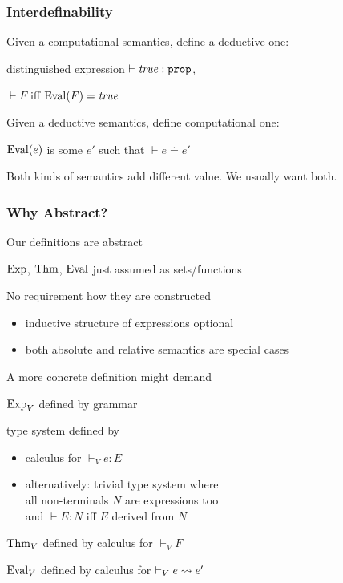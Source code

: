 \begin{frame}\frametitle{Interdefinability}
\begin{blockitems}{Given a computational semantics, define a deductive one:}
\item distinguished expression $\vdash \mathit{true}:\mathtt{prop}$,
\item $\vdash F$ iff $\mathrm{Eval}(F)=\mathit{true}$
\end{blockitems}

\begin{blockitems}{Given a deductive semantics, define computational one:}
\item $\mathrm{Eval}(e)$ is some $e'$ such that $\vdash e\doteq e'$
\end{blockitems}

Both kinds of semantics add different value. We usually want both.
\end{frame}

\begin{frame}\frametitle{Why Abstract?}
\begin{blockitems}{Our definitions are abstract}
\item $\mathrm{Exp}$, $\mathrm{Thm}$, $\mathrm{Eval}$ just assumed as sets/functions
\item No requirement how they are constructed
 \begin{itemize}
 \item inductive structure of expressions optional
 \item both absolute and relative semantics are special cases
\end{itemize}
\end{blockitems}

\begin{blockitems}{A more concrete definition might demand}
\item $\mathrm{Exp}_V$ defined by grammar
\item type system defined by
 \begin{itemize}
 \item calculus for $\vdash_V e:E$
 \item alternatively: trivial type system where \\
  all non-terminals $N$ are expressions too \\
  and $\vdash E:N$ iff $E$ derived from $N$
 \end{itemize}
\item $\mathrm{Thm}_V$ defined by calculus for $\vdash_V F$
\item $\mathrm{Eval}_V$ defined by calculus for $\vdash_V e \rightsquigarrow e'$
\end{blockitems}
\end{frame}

